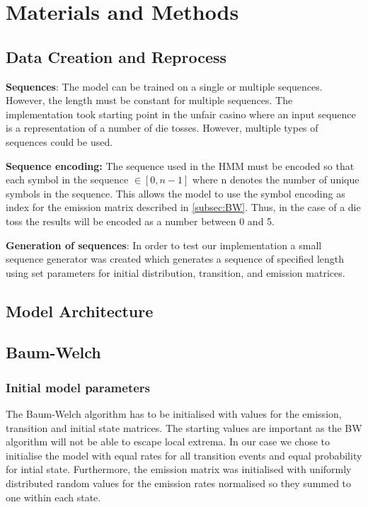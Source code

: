 
\section{Materials and Methods}

\subsection{Data Creation and Reprocess}

\textbf{Sequences}:  The model can be trained on a single or multiple sequences. However, the length must be constant for multiple sequences. The implementation took starting point in the unfair casino where an input sequence is a representation of a number of die tosses. However, multiple types of sequences could be used.

\noindent
\textbf{Sequence encoding:} The sequence used in the HMM must be encoded so that each symbol in the sequence $\in [0,n-1]$ where n denotes the number of unique symbols in the sequence. This allows the model to use the symbol encoding as index for the emission matrix described in \autoref{subsec:BW}. Thus, in the case of a die toss the results will be encoded as a number between 0 and 5.

\noindent
\textbf{Generation of sequences}: In order to test our implementation a small sequence generator was created which generates a sequence of specified length using set parameters for initial distribution, transition, and emission matrices.

\subsection{Model Architecture} 



\subsection{Baum-Welch} \label{subsec:BW}


\subsubsection{Initial model parameters}
The Baum-Welch algorithm has to be initialised with values for the emission, transition and initial state matrices. The starting values are important as the BW algorithm will not be able to escape local extrema. In our case we chose to initialise the model with equal rates for all transition events and equal probability for intial state. Furthermore, the emission matrix was initialised with uniformly distributed random values for the emission rates normalised so they summed to one within each state. 


